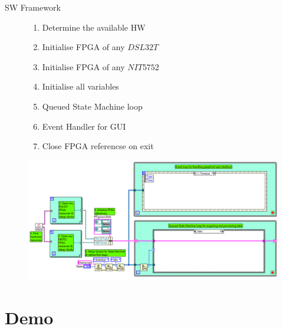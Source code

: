 \documentclass[t,12pt,english
\ifx\beamermode\undefined\else,\beamermode\fi
]{beamer}
\begin{document}
\begin{frame}{SW Framework}

\begin{figure}[!htb]

\begin{block}{\footnotesize{}}\footnotesize{}
\begin{enumerate} 
\vspace{0.05cm}
     \item \footnotesize{Determine the available HW}
     \item \footnotesize{Initialise FPGA of any $DSL32T$}
     \item \footnotesize{Initialise FPGA of any $NIT5752$ }
     \item \footnotesize{Initialise all variables}
     \item \footnotesize{Queued State Machine loop}
     \item \footnotesize{Event Handler for GUI}
     \item \footnotesize{Close FPGA referencse on exit}
\end{enumerate}
\end{block}

\endminipage
{}
\centering
\includegraphics[width=1.1\textwidth]{13.png}
\endminipage
\end{figure}

\end{frame}


\section{Demo}
\end{document}
